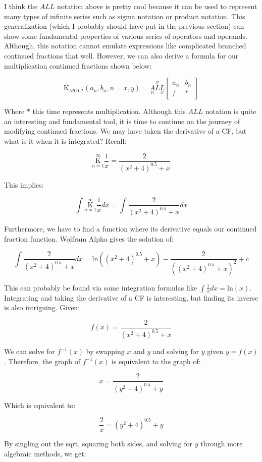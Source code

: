 \documentclass{article}
\begin{document}
I think the $ALL$ notation above is pretty cool because it can be used to represent many types of infinite series such as sigma notation or product notation. This generalization (which I probably should have put in the previous section) can show some fundamental properties of various series of operators and operands. Although, this notation cannot emulate expressions like complicated branched continued fractions that well. However, we can also derive a formula for our multiplication continued fractions shown below:

$$\text{K}_{MULT}(a_n,b_n,n=x,y)=\underset{n=x}{\overset{y}{ALL}} \begin{bmatrix}
a_n & b_n \\
/ & *
\end{bmatrix}$$

Where $*$ this time represents multiplication. Although this $ALL$ notation is quite an interesting and fundamental tool, it is time to continue on the journey of modifying continued fractions. We may have taken the derivative of a CF, but what is it when it is integrated? Recall:

$$\underset{n=1}{\overset{\infty}{\mathrm K}} \frac{1}{x}=\frac{2}{(x^2+4)^{0.5}+x}$$

This implies:

$$\int \underset{n=1}{\overset{\infty}{\mathrm K}} \frac{1}{x} dx=\int \frac{2}{(x^2+4)^{0.5}+x} dx$$

Furthermore, we have to find a function where its derivative equals our continued fraction function. Wolfram Alpha gives the solution of:

$$\int \frac{2}{(x^2+4)^{0.5}+x} dx = \text{ln}((x^2+4)^{0.5}+x)-\frac{2}{((x^2+4)^{0.5}+x)^2}+c$$

This can probably be found via some integration formulas like $\int \frac{1}{x} dx = \text{ln}(x)$. Integrating and taking the derivative of a CF is interesting, but finding its inverse is also intriguing. Given:

$$f(x)=\frac{2}{(x^2+4)^{0.5}+x}$$

We can solve for $f^{-1}(x)$ by swapping $x$ and $y$ and solving for $y$ given $y=f(x)$. Therefore, the graph of $f^{-1}(x)$ is equivalent to the graph of:

$$x=\frac{2}{(y^2+4)^{0.5}+y}$$

Which is equivalent to:

$$\frac{2}{x}=(y^2+4)^{0.5}+y$$

By singling out the sqrt, squaring both sides, and solving for $y$ through more algebraic methods, we get:
\end{document}
